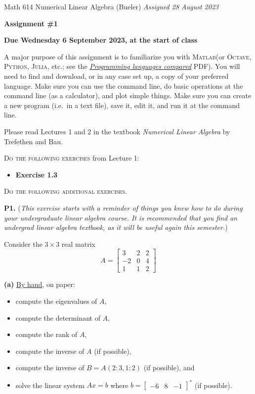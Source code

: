 \documentclass[12pt]{amsart}
\newcommand{\prob}[1]{\bigskip\noindent\textbf{#1.}\quad }
\newcommand{\epart}[1]{\medskip\noindent\textbf{(#1)}\quad }
\newcommand{\Matlab}{\textsc{Matlab}\xspace}
\newcommand{\Octave}{\textsc{Octave}\xspace}
\newcommand{\Python}{\textsc{Python}\xspace}
\newcommand{\Julia}{\textsc{Julia}\xspace}
\begin{document}
\scriptsize \noindent Math 614 Numerical Linear Algebra (Bueler) \hfill \emph{Assigned 28 August 2023}
\normalsize\medskip

\Large\centerline{\textbf{Assignment \#1}}
\large
\medskip

\centerline{\textbf{Due Wednesday 6 September 2023, at the start of class}}
\medskip
\normalsize

\thispagestyle{empty}

\bigskip

A major purpose of this assignment is to familiarize you with \Matlab (or \Octave, \Python, \Julia, etc.; see the \href{https://bueler.github.io/compareMOP.pdf}{\emph{Programming languages compared}} PDF).  You will need to find and download, or in any case set up, a copy of your preferred language.  Make sure you can use the command line, do basic operations at the command line (as a calculator), and plot simple things.  Make sure you can create a new program (i.e.~in a text file), save it, edit it, and run it at the command line.

\bigskip
\noindent Please read Lectures 1 and 2 in the textbook \emph{Numerical Linear Algebra} by Trefethen and Bau.

\bigskip
\noindent \textsc{Do the following exercises} from Lecture 1:

\begin{itemize}
\item \textbf{Exercise 1.3}
\end{itemize}


\bigskip
\noindent \textsc{Do the following additional exercises.}

\prob{P1}  (\emph{This exercise starts with a reminder of things you knew how to do during your undergraduate linear algebra course.  It is recommended that you find an undergrad linear algebra textbook, as it will be useful again this semester.})

Consider the $3\times 3$ real matrix
    $$A = \begin{bmatrix}   3     &     2    &     2 \\
                            -2    &     0    &     4 \\
                            1     &     1    &     2  \end{bmatrix}$$

\epart{a} \underline{By hand}, on paper:\begin{itemize}
\item compute the eigenvalues of $A$,
\item compute the determinant of $A$,
\item compute the rank of $A$,
\item compute the inverse of $A$ (if possible),
\item compute the inverse of $B=A(2:3,1:2)$ (if possible), and
\item solve the linear system $Ax=b$ where $b = \begin{bmatrix} -6 & 8 & -1 \end{bmatrix}^*$ (if possible).
\end{itemize}
\end{document}
